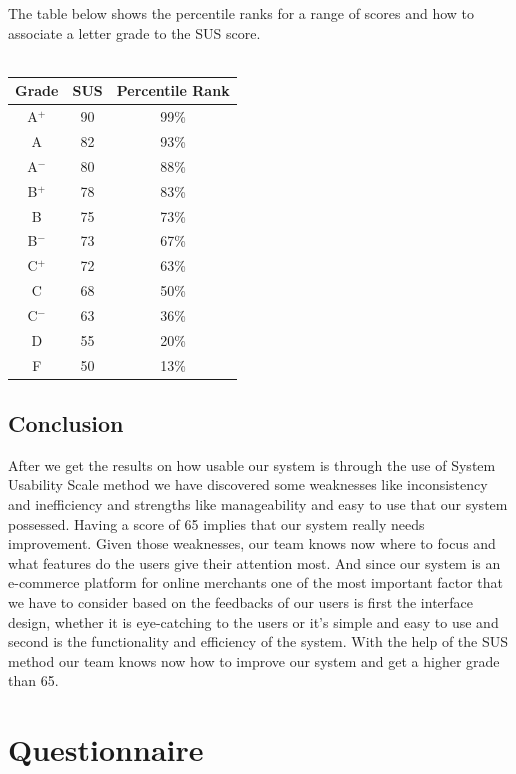 \documentclass{report}
\begin{document}
The table below shows the percentile ranks for a range of scores and how to associate a letter grade to the SUS score.\\\\
\hspace*{2cm}\begin{tabular}{ccc}
	\toprule
    Grade & SUS & Percentile Rank\\
    \midrule
    A$^+$& 90 & 99\% \\
    A  & 82 & 93\%  \\
    A$^-$ & 80 & 88\% \\
	B$^+$& 78 & 83\% \\
    B  & 75 & 73\%  \\
    B$^-$ & 73 & 67\% \\
    C$^+$& 72 & 63\% \\
    C  & 68 & 50\%  \\
    C$^-$ & 63 & 36\% \\
    D& 55 & 20\% \\
    F  & 50 & 13\%  \\
    \bottomrule
\end{tabular}\hspace*{2cm}

\newpage
\section{Conclusion}
After we get the results on how usable our system is through the use of System Usability Scale  method we have discovered some weaknesses like inconsistency and inefficiency and strengths like manageability and easy to use  that our system possessed.  Having a score of 65 implies that our system really needs improvement. Given those weaknesses, our team knows now where to focus and what features do the users give their attention most. And since our system is an e-commerce platform for online merchants one of the most important factor that we have to consider based on the feedbacks of our users is first the interface design, whether it is eye-catching to the users or it's simple and easy to use and second is the functionality and efficiency of the system. With the help of the SUS method our team knows now how to improve our system and get a higher grade than 65.
\chapter{Questionnaire}
\end{document}

